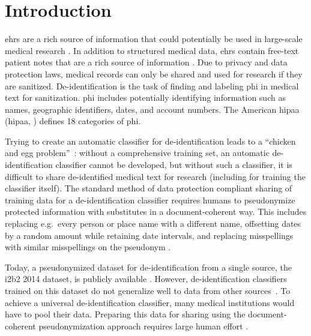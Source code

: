 

\section{Introduction}\label{sec:introduction}
%
\Acp{ehr} are a rich source of information that could potentially be used in large-scale medical research \citep{botsis2010secondary, birkhead2015uses, cowie2017electronic}.
%
In addition to structured medical data, \acp{ehr} contain free-text patient notes that are a rich source of information \citep{jensen2012mining}.
%
Due to privacy and data protection laws, medical records can only be shared and used for research if they are sanitized.
%
De-identification is the task of finding and labeling \ac{phi} in medical text for sanitization.
%
\Ac{phi} includes potentially identifying information such as names, geographic identifiers, dates, and account numbers.
%
The American \acl{hipaa} (\acs{hipaa}, \citeyear{usa1996hipaa}) defines 18 categories of \ac{phi}.

%
Trying to create an automatic classifier for de-identification leads to a ``chicken and egg problem''~\citep{uzuner2007evaluating}: without a comprehensive training set, an automatic de-identification classifier cannot be developed, but without such a classifier, it is difficult to share de-identified medical text for research (including for training the classifier itself).
%
The standard method of data protection compliant sharing of training data for a de-identification classifier requires humans to pseudonymize protected information with substitutes in a document-coherent way.
%
This includes replacing e.g.\ every person or place name with a different name, offsetting dates by a random amount while retaining date intervals, and replacing misspellings with similar misspellings on the pseudonym \cite{uzuner2007evaluating}.

%
Today, a pseudonymized dataset for de-identification from a single source, the i2b2 2014 dataset, is publicly available \citep{stubbs2015annotating}.
%
However, de-identification classifiers trained on this dataset do not generalize well to data from other sources~\citep{stubbs2017identification}.
%
To achieve a universal de-identification classifier, many medical institutions would have to pool their data.
%
Preparing this data for sharing using the document-coherent pseudonymization approach requires large human effort \citep{dernoncourt2017identification}.

